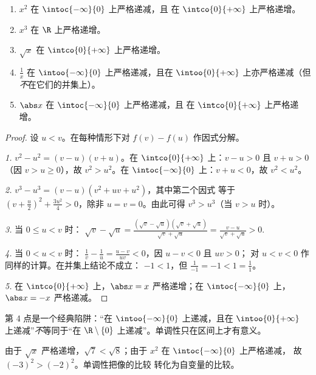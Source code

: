 \begin{proposition}[基本函数的变化]\label{prop:g11:func:refvariations}
\begin{enumerate}
  \item $x^2$ 在 $\intoc{-\infty}{0}$ 上严格递减，且
        在 $\intco{0}{+\infty}$ 上严格递增。
  \item $x^3$ 在 $\R$ 上严格递增。
  \item $\sqrt x$ 在 $\intco{0}{+\infty}$ 上严格递增。
  \item $\frac1x$ 在 $\intoo{-\infty}{0}$ 上严格递减，且在
        $\intoo{0}{+\infty}$ 上亦严格递减（但\emph{不}在它们的并集上）。
  \item $\abs x$ 在 $\intoc{-\infty}{0}$ 上严格递减，且
        在 $\intco{0}{+\infty}$ 上严格递增。
\end{enumerate}
\end{proposition}

\begin{proof}
设 $u < v$。在每种情形下对 $f(v) - f(u)$ 作因式分解。

\emph{1.} $v^2 - u^2 = (v-u)(v+u)$。在 $\intco{0}{+\infty}$ 上：$v - u > 0$
且 $v + u > 0$（因 $v > u \geq 0$），故 $v^2 > u^2$。在
$\intoc{-\infty}{0}$ 上：$v + u < 0$，故 $v^2 < u^2$。

\emph{2.} $v^3 - u^3 = (v - u)(v^2 + uv + u^2)$，其中第二个因式
等于 $\left(v + \frac u2\right)^2 + \frac{3u^2}{4} > 0$，除非
$u = v = 0$。由此可得 $v^3 > u^3$（当 $v > u$ 时）。

\emph{3.} 当 $0 \leq u < v$ 时：
$\sqrt v - \sqrt u = \frac{(\sqrt v - \sqrt u)(\sqrt v + \sqrt u)}
{\sqrt v + \sqrt u} = \frac{v - u}{\sqrt v + \sqrt u} > 0$.

\emph{4.} 当 $0 < u < v$ 时：
$\frac1v - \frac1u = \frac{u - v}{uv} < 0$，因 $u - v < 0$ 且 $uv > 0$；
对 $u < v < 0$ 作同样的计算。在并集上结论不成立：
$-1 < 1$，但 $\frac{1}{-1} = -1 < 1 = \frac11$。

\emph{5.} 在 $\intco{0}{+\infty}$ 上，$\abs x = x$ 严格递增；在
$\intoc{-\infty}{0}$ 上，$\abs x = -x$ 严格递减。
\end{proof}

\begin{remark}
第 4 点是一个经典陷阱：“在 $\intoo{-\infty}{0}$ 上递减，且在
$\intoo{0}{+\infty}$ 上递减”\emph{不}等同于“在
$\R \setminus \{0\}$ 上递减”。单调性只在区间上才有意义。
\end{remark}

\begin{example}[不计算而比较大小]
由于 $\sqrt x$ 严格递增，$\sqrt{7} < \sqrt{8}$；由于
$x^2$ 在 $\intoc{-\infty}{0}$ 上严格递减，
故 $(-3)^2 > (-2)^2$。单调性把像的比较
转化为自变量的比较。
\end{example}

